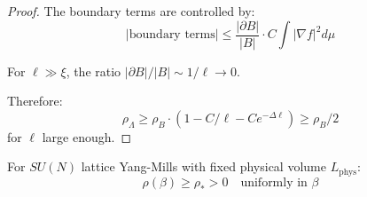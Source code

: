 \begin{proof}
The boundary terms are controlled by:
\begin{equation}
|\text{boundary terms}| \leq \frac{|\partial B|}{|B|} \cdot C \int |\nabla f|^2 d\mu
\end{equation}

For $\ell \gg \xi$, the ratio $|\partial B|/|B| \sim 1/\ell \to 0$.

Therefore:
\begin{equation}
\rho_\Lambda \geq \rho_B \cdot (1 - C/\ell - Ce^{-\Delta\ell}) \geq \rho_B/2
\end{equation}
for $\ell$ large enough.
\end{proof}

\begin{theorem}
\label{thm:uniform-lsi-all-beta-innovative}
For $SU(N)$ lattice Yang-Mills with fixed physical volume $L_{\mathrm{phys}}$:
\begin{equation}
\rho(\beta) \geq \rho_* > 0 \quad \text{uniformly in } \beta
\end{equation}
\end{theorem}

